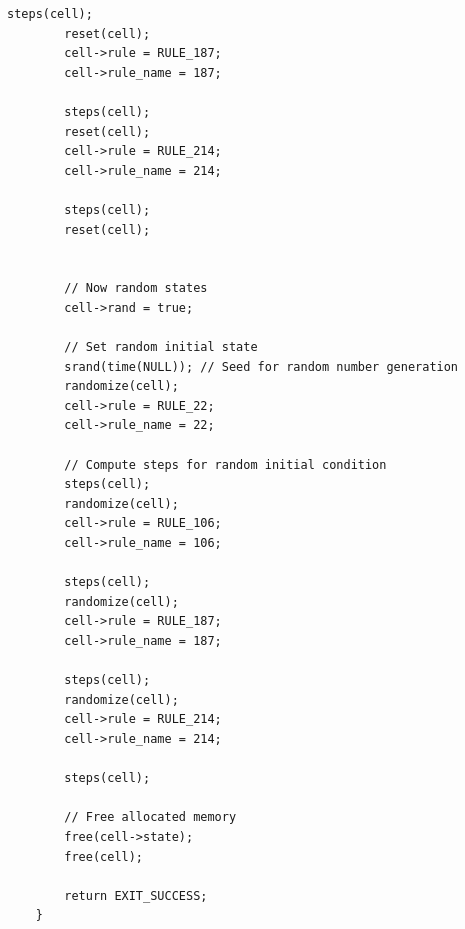\documentclass[12pt,a4paper]{article}
\begin{document}
\begin{lstlisting}[caption={\small 1d\_states.c},label={lst:p7001},basicstyle=\ttfamily\tiny]
        steps(cell);
        reset(cell); 
        cell->rule = RULE_187;
        cell->rule_name = 187;

        steps(cell);
        reset(cell); 
        cell->rule = RULE_214;
        cell->rule_name = 214;

        steps(cell);
        reset(cell); 


        // Now random states
        cell->rand = true;

        // Set random initial state
        srand(time(NULL)); // Seed for random number generation
        randomize(cell);
        cell->rule = RULE_22;
        cell->rule_name = 22;

        // Compute steps for random initial condition
        steps(cell);
        randomize(cell); 
        cell->rule = RULE_106;
        cell->rule_name = 106;

        steps(cell);
        randomize(cell); 
        cell->rule = RULE_187;
        cell->rule_name = 187;

        steps(cell);
        randomize(cell); 
        cell->rule = RULE_214;
        cell->rule_name = 214;

        steps(cell);

        // Free allocated memory
        free(cell->state);
        free(cell);

        return EXIT_SUCCESS;
    }
\end{lstlisting}


\vspace{1cm}

\end{document}
